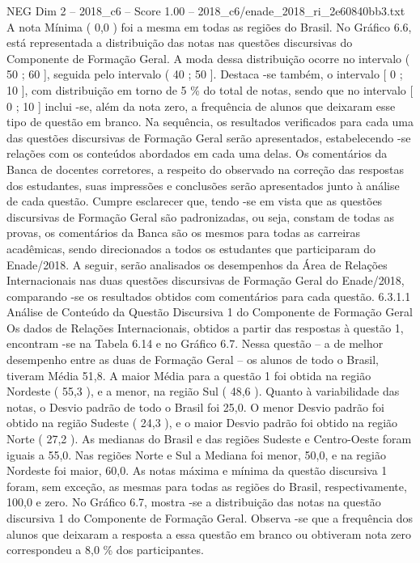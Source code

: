 \begin{textsample}{NEG Dim 2 – 2018\_c6 – Score 1.00 – 2018\_c6/enade\_2018\_ri\_2e60840bb3.txt}
A nota Mínima ( 0,0 ) foi a mesma em todas as regiões do Brasil.
No Gráfico 6.6, está representada a distribuição das notas nas questões discursivas do Componente de Formação Geral.
A moda dessa distribuição ocorre no intervalo ( 50 ; 60 ], seguida pelo intervalo ( 40 ; 50 ].
Destaca -se também, o intervalo [ 0 ; 10 ], com distribuição em torno de 5 \% do total de notas, sendo que no intervalo [ 0 ; 10 ] inclui -se, além da nota zero, a frequência de alunos que deixaram esse tipo de questão em branco.
Na sequência, os resultados verificados para cada uma das questões discursivas de Formação Geral serão apresentados, estabelecendo -se relações com os conteúdos abordados em cada uma delas.
Os comentários da Banca de docentes corretores, a respeito do observado na correção das respostas dos estudantes, suas impressões e conclusões serão apresentados junto à análise de cada questão.
Cumpre esclarecer que, tendo -se em vista que as questões discursivas de Formação Geral são padronizadas, ou seja, constam de todas as provas, os comentários da Banca são os mesmos para todas as carreiras acadêmicas, sendo direcionados a todos os estudantes que participaram do Enade/2018.
A seguir, serão analisados os desempenhos da Área de Relações Internacionais nas duas questões discursivas de Formação Geral do Enade/2018, comparando -se os resultados obtidos com comentários para cada questão. 6.3.1.1 Análise de Conteúdo da Questão Discursiva 1 do Componente de Formação Geral Os dados de Relações Internacionais, obtidos a partir das respostas à questão 1, encontram -se na Tabela 6.14 e no Gráfico 6.7.
Nessa questão – a de melhor desempenho entre as duas de Formação Geral – os alunos de todo o Brasil, tiveram Média 51,8.
A maior Média para a questão 1 foi obtida na região Nordeste ( 55,3 ), e a menor, na região Sul ( 48,6 ).
Quanto à variabilidade das notas, o Desvio padrão de todo o Brasil foi 25,0.
O menor Desvio padrão foi obtido na região Sudeste ( 24,3 ), e o maior Desvio padrão foi obtido na região Norte ( 27,2 ).
As medianas do Brasil e das regiões Sudeste e Centro-Oeste foram iguais a 55,0.
Nas regiões Norte e Sul a Mediana foi menor, 50,0, e na região Nordeste foi maior, 60,0.
As notas máxima e mínima da questão discursiva 1 foram, sem exceção, as mesmas para todas as regiões do Brasil, respectivamente, 100,0 e zero.
No Gráfico 6.7, mostra -se a distribuição das notas na questão discursiva 1 do Componente de Formação Geral.
Observa -se que a frequência dos alunos que deixaram a resposta a essa questão em branco ou obtiveram nota zero correspondeu a 8,0 \% dos participantes.

\end{textsample}

